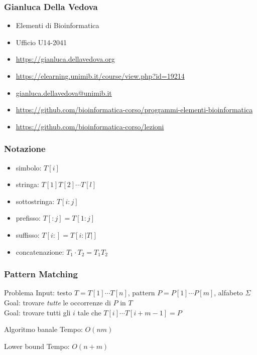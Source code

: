 \begin{frame}
  \titlepage
\end{frame}


\begin{frame}\frametitle{Gianluca Della Vedova}
\begin{itemize}
\item
Elementi di Bioinformatica
\item
Ufficio U14-2041
\item
\url{https://gianluca.dellavedova.org}
\item
\url{https://elearning.unimib.it/course/view.php?id=19214}
\item
\url{gianluca.dellavedova@unimib.it}
\item\url{https://github.com/bioinformatica-corso/programmi-elementi-bioinformatica}
\item\url{https://github.com/bioinformatica-corso/lezioni}
\end{itemize}
\end{frame}

\begin{frame}[fragile]
\frametitle{Notazione}
\begin{itemize}
\item
\alert{simbolo}: $T[i]$\\
\item
\alert{stringa}: $T[1]T[2]\cdots T[l]$\\
\item
\alert{sottostringa}: $T[i:j]$\\
\item
\alert{prefisso}: $T[:j]=T[1:j]$\\
\item
\alert{suffisso}: $T[i:]=T[i:|T|]$
\item
\alert{concatenazione}: $T_{1}\cdot T_{2} = T_{1}T_{2}$
\end{itemize}
\end{frame}


\begin{frame}[fragile]
\frametitle{Pattern Matching}
\begin{block}{Problema}
\alert{Input}: testo $T=T[1]\cdots T[n]$, pattern $P=P[1]\cdots P[m]$, alfabeto $\Sigma$\\
\alert{Goal}: trovare \emph{tutte} le occorrenze di $P$ in $T$\\
\alert{Goal}: trovare tutti gli $i$ tale che $T[i]\cdots T[i+m-1]=P$
\end{block}
\begin{block}{Algoritmo banale}
\alert{Tempo}: $O(nm)$
\end{block}
\begin{block}{Lower bound}
\alert{Tempo}: $O(n+m)$
\end{block}
\end{frame}

